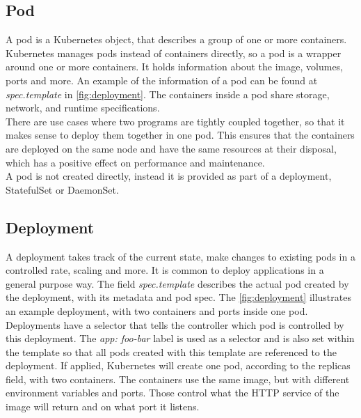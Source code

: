 \subsection{Pod}
A pod is a Kubernetes object, that describes a group of one or more containers.
Kubernetes manages pods instead of containers directly, so a pod is a wrapper around one or more containers.
It holds information about the image, volumes, ports and more.
An example of the information of a pod can be found at \textit{spec.template} in \autoref{fig:deployment}.
The containers inside a pod share storage, network, and runtime specifications.
\\
There are use cases where two programs are tightly coupled together, so that it makes sense to deploy them together in one pod.
This ensures that the containers are deployed on the same node and have the same resources at their disposal, which has a positive effect on performance and maintenance.
\\
A pod is not created directly, instead it is provided as part of a deployment, StatefulSet or DaemonSet.~\cite{KUBERNETES-POD}

\subsection{Deployment}\label{subsec:deployment}

A deployment takes track of the current state, make changes to existing pods in a controlled rate, scaling and more.
It is common to deploy applications in a general purpose way.
The field \textit{spec.template} describes the actual pod created by the deployment, with its metadata and pod spec.
The \autoref{fig:deployment} illustrates an example deployment, with two containers and ports inside one pod.
Deployments have a selector that tells the controller which pod is controlled by this deployment.
The \textit{app: foo-bar} label is used as a selector and is also set within the template so that all pods created with this template are referenced to the deployment.
If applied, Kubernetes will create one pod, according to the replicas field, with two containers.
The containers use the same image, but with different environment variables and ports.
Those control what the HTTP service of the image will return and on what port it listens.~\cite{KUBERNETES-DEPLOYMENT}

